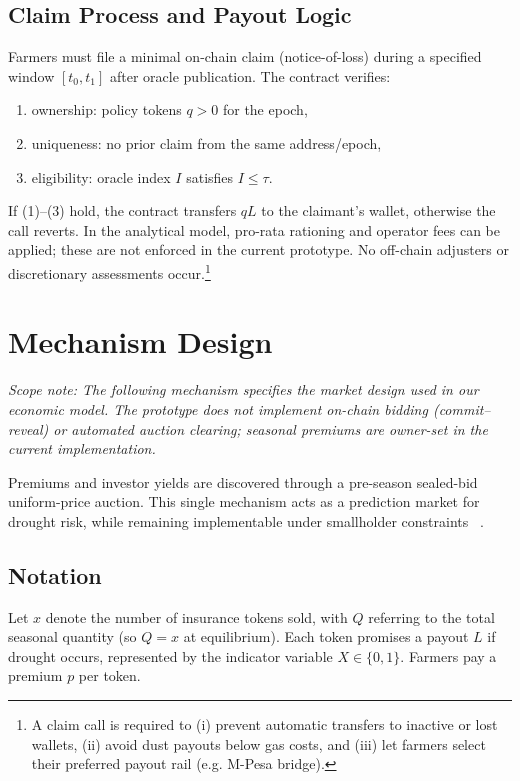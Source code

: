 \documentclass[11pt,a4paper]{article}
\begin{document}
		\subsection{Claim Process and Payout Logic}\label{subsec:claim-process-and-payout-logic}
		Farmers must file a minimal on-chain claim (notice-of-loss) during a specified window $[t_0,t_1]$ after oracle publication.
		The contract verifies:
		\begin{enumerate}
			\item ownership: policy tokens $q>0$ for the epoch,
			\item uniqueness: no prior claim from the same address/epoch,
			\item eligibility: oracle index $I$ satisfies $I \le \tau$.
		\end{enumerate}
		If (1)--(3) hold, the contract transfers $qL$ to the claimant’s wallet, otherwise the call reverts. In the analytical model, pro-rata rationing and operator fees can be applied; these are not enforced in the current prototype.
		No off-chain adjusters or discretionary assessments occur.\footnote{A claim call is required to (i) prevent automatic transfers to inactive or lost wallets, (ii) avoid dust payouts below gas costs, and (iii) let farmers select their preferred payout rail (e.g. M-Pesa bridge).}

		\section{Mechanism Design}\label{sec:mechanism-design}

		\noindent\textit{Scope note: The following mechanism specifies the market design used in our economic model. The prototype does not implement on-chain bidding (commit--reveal) or automated auction clearing; seasonal premiums are owner-set in the current implementation.}

		Premiums and investor yields are discovered through a pre-season sealed-bid uniform-price auction.
		This single mechanism acts as a prediction market for drought risk, while remaining implementable under smallholder constraints ~\parencite{wilson1979auctions,ausubel2002demand}.

		\subsection{Notation}\label{subsec:notation}

		Let $x$ denote the number of insurance tokens sold, with $Q$ referring to the total seasonal quantity (so $Q=x$ at equilibrium).
		Each token promises a payout $L$ if drought occurs, represented by the indicator variable $X \in \{0,1\}$.
		Farmers pay a premium $p$ per token.
\end{document}

